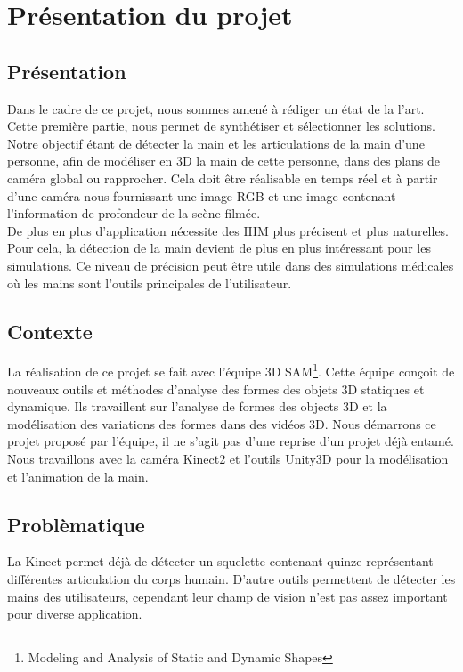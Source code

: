 \chapter{Présentation du projet}

\section{Présentation}
Dans le cadre de ce projet, nous sommes amené à rédiger un état de la l'art.
Cette première partie, nous permet de synthétiser et sélectionner les 
solutions. Notre objectif étant de détecter la main et les articulations 
de la main d'une personne, afin de modéliser en 3D la main de cette personne, 
dans des plans de caméra global ou rapprocher. Cela doit être réalisable en 
temps réel et à partir d'une caméra nous fournissant une image RGB et une 
image contenant l'information de profondeur de la scène filmée.\\

De plus en plus d'application nécessite des IHM plus précisent et plus 
naturelles. Pour cela, la détection de la main devient de plus en plus 
intéressant pour les simulations. Ce niveau de précision peut être
utile dans des simulations médicales où les mains sont l'outils principales 
de l'utilisateur.\\ %

\section{Contexte}
La réalisation de ce projet se fait avec l'équipe 3D SAM\footnote{Modeling 
and Analysis of Static and Dynamic Shapes}. Cette équipe conçoit de 
nouveaux outils et méthodes d'analyse des formes des objets 3D statiques 
et dynamique. Ils travaillent sur l'analyse de formes des objects 3D et la 
modélisation des variations des formes dans des vidéos 3D. Nous démarrons 
ce projet proposé par l'équipe, il ne s'agit pas d'une reprise d'un projet 
déjà entamé. Nous travaillons avec la caméra Kinect2 et l'outils Unity3D 
pour la modélisation et l'animation de la main.

\section{Problèmatique}
La Kinect permet déjà de détecter un squelette contenant quinze représentant 
différentes articulation du corps humain. 
D'autre outils permettent de détecter les mains des utilisateurs, cependant leur
champ de vision n'est pas assez important pour diverse application.

